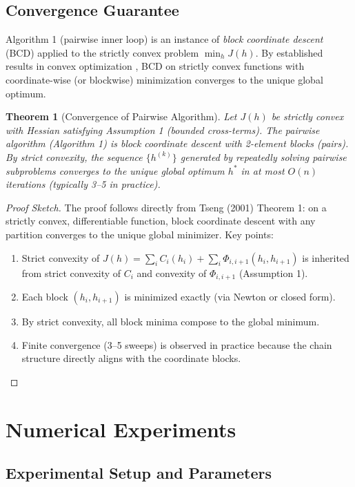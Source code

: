 \documentclass[12pt]{article}
\newtheorem{theorem}{Theorem}[section]
\theoremstyle{definition}
\begin{document}
\subsection{Convergence Guarantee}

Algorithm 1 (pairwise inner loop) is an instance of \emph{block coordinate descent} (BCD) applied to the strictly convex problem $\min_h J(h)$. By established results in convex optimization \cite{Tseng:BCD}, BCD on strictly convex functions with coordinate-wise (or blockwise) minimization converges to the unique global optimum.

\begin{theorem}[Convergence of Pairwise Algorithm]
Let $J(h)$ be strictly convex with Hessian satisfying Assumption 1 (bounded cross-terms). The pairwise algorithm (Algorithm 1) is block coordinate descent with 2-element blocks (pairs). By strict convexity, the sequence $\{h^{(k)}\}$ generated by repeatedly solving pairwise subproblems converges to the unique global optimum $h^*$ in at most $O(n)$ iterations (typically 3--5 in practice).
\end{theorem}

\begin{proof}[Proof Sketch]
The proof follows directly from Tseng (2001) Theorem 1: on a strictly convex, differentiable function, block coordinate descent with any partition converges to the unique global minimizer. Key points:
\begin{enumerate}
    \item Strict convexity of $J(h) = \sum_i C_i(h_i) + \sum_i \Phi_{i,i+1}(h_i, h_{i+1})$ is inherited from strict convexity of $C_i$ and convexity of $\Phi_{i,i+1}$ (Assumption 1).
    \item Each block $(h_i, h_{i+1})$ is minimized exactly (via Newton or closed form).
    \item By strict convexity, all block minima compose to the global minimum.
    \item Finite convergence (3--5 sweeps) is observed in practice because the chain structure directly aligns with the coordinate blocks.
\end{enumerate}
\end{proof}

\section{Numerical Experiments}

\subsection*{Experimental Setup and Parameters}
\end{document}

